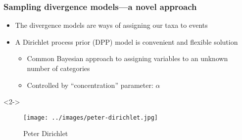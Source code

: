\begin{frame}[t]
    \frametitle{Sampling divergence models---a novel approach}
    \begin{itemize}[<+->]
        \item The divergence models are ways of assigning our taxa to events
        \item A Dirichlet process prior (DPP) model is convenient and flexible
            solution
            \begin{itemize}[<+->]
                \item Common Bayesian approach to assigning variables to an
                    unknown number of categories
                \item Controlled by ``concentration'' parameter: $\alpha$
            \end{itemize}
    \end{itemize}

    \begin{uncoverenv}<2->
    \begin{figure}
    \begin{center}
        \texttt{[image: ../images/peter-dirichlet.jpg]}
        \caption{Peter Dirichlet}
    \end{center}
    \end{figure}
    \end{uncoverenv}
\end{frame}

